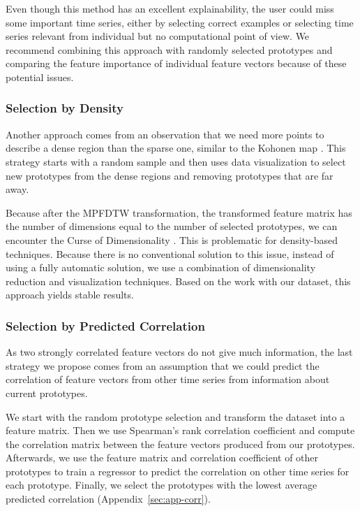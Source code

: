 Even though this method has an excellent explainability, the user could miss some important time series, either by selecting correct examples or selecting time series relevant from individual but no computational point of view. We recommend combining this approach with randomly selected prototypes and comparing the feature importance of individual feature vectors because of these potential issues.

\subsubsection{Selection by Density}
Another approach comes from an observation that we need more points to describe a dense region than the sparse one, similar to the Kohonen map \cite{exp:Kohonen1982}. This strategy starts with a random sample and then uses data visualization to select new prototypes from the dense regions and removing prototypes that are far away.

Because after the MPFDTW transformation, the transformed feature matrix has the number of dimensions equal to the number of selected prototypes, we can encounter the Curse of Dimensionality \cite{exp:curse-of-dim}. This is problematic for density-based techniques. Because there is no conventional solution to this issue, instead of using a fully automatic solution, we use a combination of dimensionality reduction and visualization techniques. Based on the work with our dataset, this approach yields stable results.

\subsubsection{Selection by Predicted Correlation}
As two strongly correlated feature vectors do not give much information, the last strategy we propose comes from an assumption that we could predict the correlation of feature vectors from other time series from information about current prototypes. 

We start with the random prototype selection and transform the dataset into a feature matrix. Then we use Spearman's rank correlation coefficient and compute the correlation matrix between the feature vectors produced from our prototypes. Afterwards, we use the feature matrix and correlation coefficient of other prototypes to train a regressor to predict the correlation on other time series for each prototype. Finally, we select the prototypes with the lowest average predicted correlation (Appendix~\ref{sec:app-corr}).


